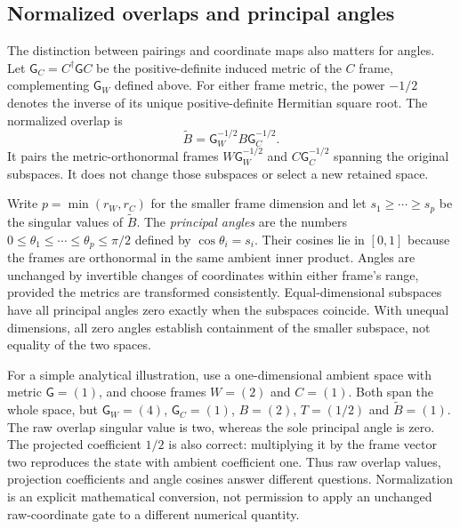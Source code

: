 \subsection{Normalized overlaps and principal angles}

The distinction between pairings and coordinate maps also matters for angles.
Let $\mathsf G_C=C^{\dagger}\mathsf G C$ be the positive-definite induced
metric of the $C$ frame, complementing $\mathsf G_W$ defined above. For either
frame metric, the power $-1/2$ denotes the inverse of its unique positive-definite
Hermitian square root. The normalized overlap is
\begin{equation}
  \widetilde B=\mathsf G_W^{-1/2}B\mathsf G_C^{-1/2}.
  \label{eq:symmetry-normalized-overlap}
\end{equation}
It pairs the metric-orthonormal frames $W\mathsf G_W^{-1/2}$ and
$C\mathsf G_C^{-1/2}$ spanning the original subspaces. It does not change
those subspaces or select a new retained space.

\begin{definition}
\label{def:symmetry-principal-angles}
Write $p=\min(r_W,r_C)$ for the smaller frame dimension and let
$s_1\geq\cdots\geq s_p$ be the singular values of $\widetilde B$.
The \emph{principal angles} are the numbers
$0\leq\theta_1\leq\cdots\leq\theta_p\leq\pi/2$ defined by
$\cos\theta_i=s_i$. Their cosines lie in $[0,1]$ because the frames are
orthonormal in the same ambient inner product. Angles are unchanged by
invertible changes of coordinates within either frame's range, provided the
metrics are transformed consistently. Equal-dimensional subspaces have all
principal angles zero exactly when the subspaces coincide. With unequal
dimensions, all zero angles establish containment of the smaller subspace,
not equality of the two spaces.
\end{definition}

For a simple analytical illustration, use a one-dimensional ambient space
with metric $\mathsf G=(1)$, and choose frames $W=(2)$ and $C=(1)$.
Both span the whole space, but $\mathsf G_W=(4)$, $\mathsf G_C=(1)$,
$B=(2)$, $T=(1/2)$ and $\widetilde B=(1)$. The raw overlap singular value
is two, whereas the sole principal angle is zero. The projected coefficient
$1/2$ is also correct: multiplying it by the frame vector two reproduces the
state with ambient coefficient one. Thus raw overlap values, projection
coefficients and angle cosines answer different questions. Normalization is
an explicit mathematical conversion, not permission to apply an unchanged
raw-coordinate gate to a different numerical quantity.

